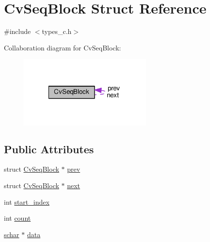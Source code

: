 \hypertarget{structCvSeqBlock}{\section{Cv\-Seq\-Block Struct Reference}
\label{structCvSeqBlock}
}


{\ttfamily \#include $<$types\-\_\-c.\-h$>$}



Collaboration diagram for Cv\-Seq\-Block\-:\nopagebreak
\begin{figure}[H]
\begin{center}
\leavevmode
\includegraphics[width=190pt]{structCvSeqBlock__coll__graph}
\end{center}
\end{figure}
\subsection*{Public Attributes}
\begin{DoxyCompactItemize}
\item 
struct \hyperlink{structCvSeqBlock}{Cv\-Seq\-Block} $\ast$ \hyperlink{structCvSeqBlock_a16d7a9e680c3533cc670856b930e25d4}{prev}
\item 
struct \hyperlink{structCvSeqBlock}{Cv\-Seq\-Block} $\ast$ \hyperlink{structCvSeqBlock_a70b6d4b52105a1e8c5def6227bcc869f}{next}
\item 
int \hyperlink{structCvSeqBlock_a0a34f720596ad287c8a2362017a37d88}{start\-\_\-index}
\item 
int \hyperlink{structCvSeqBlock_a46540928aea24563e6f58210efc5241b}{count}
\item 
\hyperlink{core_2types__c_8h_a0fd9ce9d735064461bebfe6037026093}{schar} $\ast$ \hyperlink{structCvSeqBlock_a590c97caa64f80f3478d9bede539d0ae}{data}
\end{DoxyCompactItemize}


